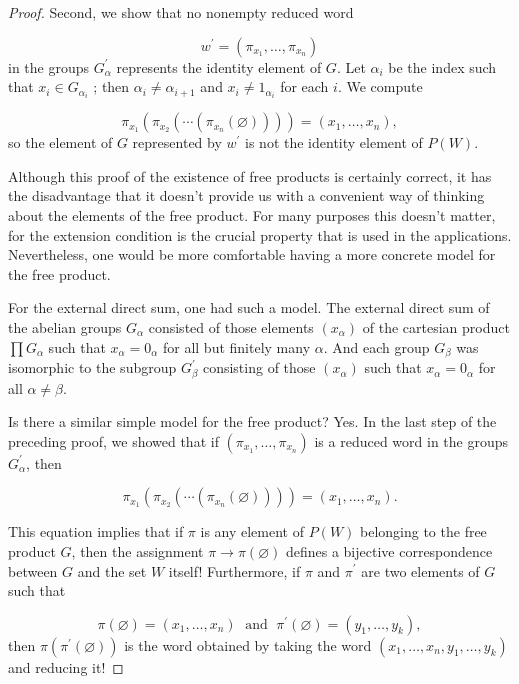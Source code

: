 \begin{proof}
Second, we show that no nonempty reduced word

\[
w^{\prime } = ( {{\pi }_{x_{1}},\ldots ,{\pi }_{x_{n}}})
\]
in the groups \(G_{\alpha }^{\prime }\) represents the identity element of \(G\). Let \({\alpha }_{i}\) be the index such that \(x_{i} \in {G}_{{\alpha }_{i}}\) ; then \({\alpha }_{i} \neq {\alpha }_{i + 1}\) and \(x_{i} \neq {1}_{{\alpha }_{i}}\) for each \(i\). We compute

\[
{\pi }_{x_{1}}( {{\pi }_{x_{2}}( {\cdots ( {{\pi }_{x_{n}}( \varnothing ) }) }) }) = ( {x_{1},\ldots ,x_{n}}),
\]
so the element of \(G\) represented by \(w^{\prime }\) is not the identity element of \(P( W)\).

Although this proof of the existence of free products is certainly correct, it has the disadvantage that it doesn't provide us with a convenient way of thinking about the elements of the free product. For many purposes this doesn't matter, for the extension condition is the crucial property that is used in the applications. Nevertheless, one would be more comfortable having a more concrete model for the free product.

For the external direct sum, one had such a model. The external direct sum of the abelian groups \(G_{\alpha }\) consisted of those elements \(( x_{\alpha })\) of the cartesian product \(\prod {G}_{\alpha }\) such that \(x_{\alpha } = 0_{\alpha }\) for all but finitely many \(\alpha\). And each group \(G_{\beta }\) was isomorphic to the subgroup \(G_{\beta }^{\prime }\) consisting of those \(( x_{\alpha })\) such that \(x_{\alpha } = 0_{\alpha }\) for all \(\alpha \neq \beta\).

Is there a similar simple model for the free product? Yes. In the last step of the preceding proof, we showed that if \(( {{\pi }_{x_{1}},\ldots ,{\pi }_{x_{n}}})\) is a reduced word in the groups \(G_{\alpha }^{\prime }\), then

\[
{\pi }_{x_{1}}( {{\pi }_{x_{2}}( {\cdots ( {{\pi }_{x_{n}}( \varnothing ) }) }) }) = ( {x_{1},\ldots ,x_{n}}).
\]

This equation implies that if \(\pi\) is any element of \(P( W)\) belonging to the free product \(G\), then the assignment \(\pi \rightarrow \pi ( \varnothing )\) defines a bijective correspondence between \(G\) and the set \(W\) itself! Furthermore, if \(\pi\) and \({\pi }^{\prime }\) are two elements of \(G\) such that

\[
\pi ( \varnothing ) = ( {x_{1},\ldots ,x_{n}}) \;\text{ and }\;{\pi }^{\prime }( \varnothing ) = ( {y_{1},\ldots ,y_{k}}),
\]
then \(\pi ( {{\pi }^{\prime }( \varnothing ) })\) is the word obtained by taking the word \(( {x_{1},\ldots ,x_{n},y_{1},\ldots ,y_{k}})\) and reducing it!


\end{proof}
